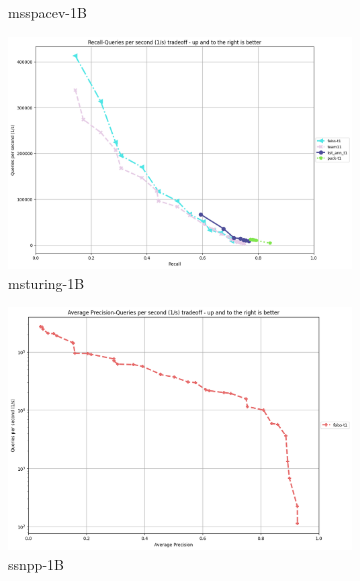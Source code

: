 \begin{figure}[ht]
\begin{subfigure}{0.48\textwidth}
      \caption{msspacev-1B}
  \end{subfigure}
  \begin{subfigure}{0.48\textwidth}
    \centering
    \includegraphics[width=\linewidth]{../t1_t2/results/T1/neurips21/msturing-1B.png}
    \caption{msturing-1B}
  \end{subfigure}
  \begin{subfigure}{0.48\textwidth}
    \centering
    \includegraphics[width=\linewidth]{../t1_t2/results/T1/neurips21/ssnpp-1B.png}
      \caption{ssnpp-1B}
  \end{subfigure}
  \begin{subfigure}{0.48\textwidth}
    \centering

\end{subfigure}
\end{figure}
